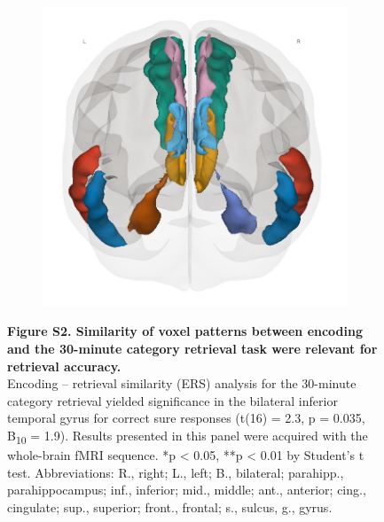 \begin{figure}[!ht]
\begin{subfigure}[]{0.19\linewidth}
\end{subfigure}
\begin{subfigure}[]{0.19\linewidth}
    \centering
    \includegraphics[width=\linewidth]{paper/src/figures/wb_rois_back.jpg}
\end{subfigure}
     \caption*{\textbf{Figure S2. Similarity of voxel patterns between encoding and the 30-minute category retrieval task were relevant for retrieval accuracy.} \\ \vspace{0.5em}
Encoding – retrieval similarity (ERS) analysis for the 30-minute category retrieval yielded significance in the bilateral inferior temporal gyrus for correct sure responses (t(16) = 2.3, p = 0.035, B\textsubscript{10} = 1.9).  Results presented in this panel were acquired with the whole-brain fMRI sequence. *p < 0.05, **p < 0.01 by Student’s t test. Abbreviations: R., right; L., left; B., bilateral; parahipp., parahippocampus; inf., inferior; mid., middle; ant., anterior; cing., cingulate; sup., superior; front., frontal; s., sulcus, g., gyrus.
}
\end{figure}

\newpage


